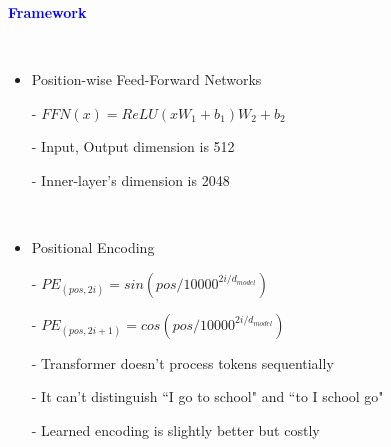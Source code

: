 \documentclass[professionalfont]{beamer}
\begin{document}
\begin{frame}

\begin{center}
    { \textbf{\textcolor{blue}{ {\fontsize{12}{14}\selectfont Framework} }} }
\end{center}
\\[0.5cm]

\begin{itemize}
    \item Position-wise Feed-Forward Networks

    - \( FFN(x) = ReLU(xW_1+b_1)W_2 + b_2 \)

    - Input, Output dimension is 512

    - Inner-layer's dimension is 2048

    \\[0.5cm]

    \item Positional Encoding

    - \( PE_{(pos,2i)} = sin(pos/10000^{2i/d_{model}}) \)

    - \( PE_{(pos,2i+1)} = cos(pos/10000^{2i/d_{model}}) \)

    - Transformer doesn't process tokens sequentially

    - It can't distinguish ``I go to school" and ``to I school go"

    - Learned encoding is slightly better but costly
\end{itemize}

\end{frame}
\end{document}
